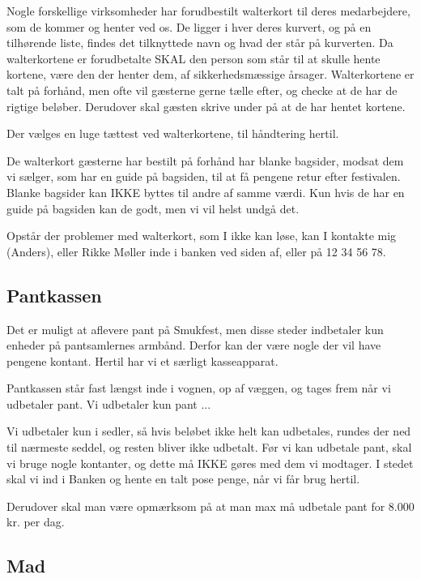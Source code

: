 Nogle forskellige virksomheder har forudbestilt walterkort til deres medarbejdere, 
som de kommer og henter ved os. 
De ligger i hver deres kurvert, og på en tilhørende liste, findes det tilknyttede navn 
og hvad der står på kurverten.
Da walterkortene er forudbetalte SKAL den person 
som står til at skulle hente kortene, være den der henter dem, af sikkerhedsmæssige årsager.
Walterkortene er talt på forhånd, men ofte vil gæsterne gerne tælle efter, 
og checke at de har de rigtige beløber.
Derudover skal gæsten skrive under på at de har hentet kortene.

Der vælges en luge tættest ved walterkortene, til håndtering hertil.

De walterkort gæsterne har bestilt på forhånd har blanke bagsider, modsat dem vi sælger,
som har en guide på bagsiden, til at få pengene retur efter festivalen.
Blanke bagsider kan IKKE byttes til andre af samme værdi. Kun hvis de har en guide på bagsiden 
kan de godt, men vi vil helst undgå det.

Opstår der problemer med walterkort, som I ikke kan løse, kan I kontakte mig (Anders), eller Rikke Møller 
inde i banken ved siden af, eller på 12 34 56 78. 

\subsection{Pantkassen}

Det er muligt at aflevere pant på Smukfest, men disse steder indbetaler kun enheder på pantsamlernes armbånd.
Derfor kan der være nogle der vil have pengene kontant. Hertil har vi et særligt kasseapparat.

Pantkassen står fast længst inde i vognen, op af væggen, og tages frem når vi udbetaler pant.
Vi udbetaler kun pant ...

Vi udbetaler kun i sedler, så hvis beløbet ikke helt kan udbetales, rundes der ned 
til nærmeste seddel, og resten bliver ikke udbetalt. 
Før vi kan udbetale pant, skal vi bruge nogle kontanter, og dette må IKKE gøres med dem vi modtager.
I stedet skal vi ind i Banken og hente en talt pose penge, når vi får brug hertil.

Derudover skal man være opmærksom på at man max må udbetale pant for 8.000 kr. per dag.

\subsection{Mad}

